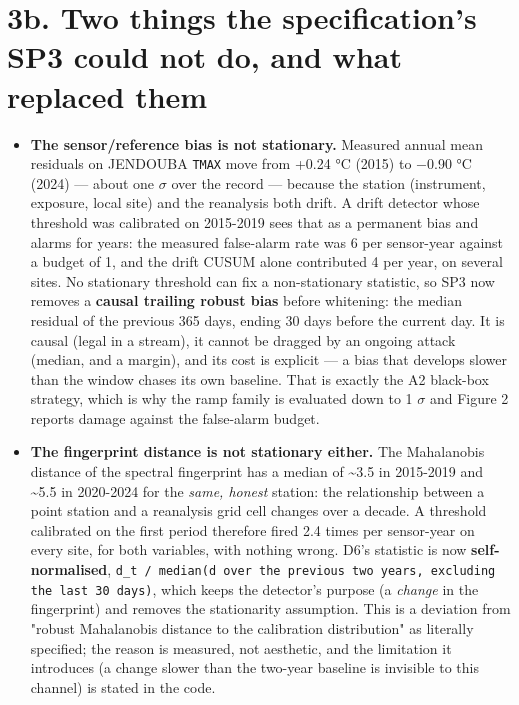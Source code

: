 \documentclass[10pt,a4paper]{article}
\begin{document}
\section*{3b. Two things the specification's SP3 could not do, and what replaced them}
\begin{itemize}
\item \textbf{The sensor/\allowbreak{}reference bias is not stationary.} Measured annual mean residuals
on JENDOUBA \texttt{TMAX} move from +0.24 °C (2015) to $-$0.90 °C (2024) — about one $\sigma$ over the record — because the station (instrument, exposure, local site) and the reanalysis both drift. A drift detector whose threshold was calibrated on 2015-\allowbreak{}2019 sees that as a permanent bias and alarms for years: the measured false-\allowbreak{}alarm rate was 6 per sensor-\allowbreak{}year against a budget of 1, and the drift CUSUM alone contributed 4 per year, on several sites. No stationary threshold can fix a non-\allowbreak{}stationary statistic, so SP3 now removes a \textbf{causal trailing robust bias} before whitening: the median residual of the previous 365 days, ending 30 days before the current day. It is causal (legal in a stream), it cannot be dragged by an ongoing attack (median, and a margin), and its cost is explicit — a bias that develops slower than the window chases its own baseline. That is exactly the A2 black-\allowbreak{}box strategy, which is why the ramp family is evaluated down to 1 $\sigma$ and Figure 2 reports damage against the false-\allowbreak{}alarm budget.

\item \textbf{The fingerprint distance is not stationary either.} The Mahalanobis distance
of the spectral fingerprint has a median of \textasciitilde{}3.5 in 2015-\allowbreak{}2019 and \textasciitilde{}5.5 in 2020-\allowbreak{}2024 for the \emph{same, honest} station: the relationship between a point station and a reanalysis grid cell changes over a decade. A threshold calibrated on the first period therefore fired 2.4 times per sensor-\allowbreak{}year on every site, for both variables, with nothing wrong. D6's statistic is now \textbf{self-\allowbreak{}normalised}, \texttt{d\_\allowbreak{}t /\allowbreak{} median(d over the previous two years, excluding the last 30 days)}, which keeps the detector's purpose (a \emph{change} in the fingerprint) and removes the stationarity assumption. This is a deviation from "robust Mahalanobis distance to the calibration distribution" as literally specified; the reason is measured, not aesthetic, and the limitation it introduces (a change slower than the two-\allowbreak{}year baseline is invisible to this channel) is stated in the code.

\end{itemize}
\end{document}
